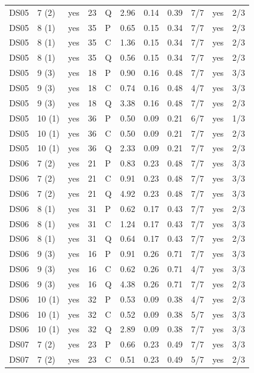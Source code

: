 \documentclass[10pt]{article}
\begin{document}
{\begin{longtable}{lllrlrrrrlr}
DS05 & 7 (2) & yes & 23 & Q & 2.96 & 0.14 & 0.39 & 7/7 & yes & 2/3 \\
DS05 & 8 (1) & yes & 35 & P & 0.65 & 0.15 & 0.34 & 7/7 & yes & 2/3 \\
DS05 & 8 (1) & yes & 35 & C & 1.36 & 0.15 & 0.34 & 7/7 & yes & 2/3 \\
DS05 & 8 (1) & yes & 35 & Q & 0.56 & 0.15 & 0.34 & 7/7 & yes & 2/3 \\
DS05 & 9 (3) & yes & 18 & P & 0.90 & 0.16 & 0.48 & 7/7 & yes & 3/3 \\
DS05 & 9 (3) & yes & 18 & C & 0.74 & 0.16 & 0.48 & 4/7 & yes & 3/3 \\
DS05 & 9 (3) & yes & 18 & Q & 3.38 & 0.16 & 0.48 & 7/7 & yes & 2/3 \\
DS05 & 10 (1) & yes & 36 & P & 0.50 & 0.09 & 0.21 & 6/7 & yes & 1/3 \\
DS05 & 10 (1) & yes & 36 & C & 0.50 & 0.09 & 0.21 & 7/7 & yes & 2/3 \\
DS05 & 10 (1) & yes & 36 & Q & 2.33 & 0.09 & 0.21 & 7/7 & yes & 2/3 \\
\midrule
DS06 & 7 (2) & yes & 21 & P & 0.83 & 0.23 & 0.48 & 7/7 & yes & 3/3 \\
DS06 & 7 (2) & yes & 21 & C & 0.91 & 0.23 & 0.48 & 7/7 & yes & 3/3 \\
DS06 & 7 (2) & yes & 21 & Q & 4.92 & 0.23 & 0.48 & 7/7 & yes & 3/3 \\
DS06 & 8 (1) & yes & 31 & P & 0.62 & 0.17 & 0.43 & 7/7 & yes & 2/3 \\
DS06 & 8 (1) & yes & 31 & C & 1.24 & 0.17 & 0.43 & 7/7 & yes & 3/3 \\
DS06 & 8 (1) & yes & 31 & Q & 0.64 & 0.17 & 0.43 & 7/7 & yes & 2/3 \\
DS06 & 9 (3) & yes & 16 & P & 0.91 & 0.26 & 0.71 & 7/7 & yes & 3/3 \\
DS06 & 9 (3) & yes & 16 & C & 0.62 & 0.26 & 0.71 & 4/7 & yes & 3/3 \\
DS06 & 9 (3) & yes & 16 & Q & 4.38 & 0.26 & 0.71 & 7/7 & yes & 2/3 \\
DS06 & 10 (1) & yes & 32 & P & 0.53 & 0.09 & 0.38 & 4/7 & yes & 2/3 \\
DS06 & 10 (1) & yes & 32 & C & 0.52 & 0.09 & 0.38 & 5/7 & yes & 3/3 \\
DS06 & 10 (1) & yes & 32 & Q & 2.89 & 0.09 & 0.38 & 7/7 & yes & 3/3 \\
\midrule
DS07 & 7 (2) & yes & 23 & P & 0.66 & 0.23 & 0.49 & 7/7 & yes & 3/3 \\
DS07 & 7 (2) & yes & 23 & C & 0.51 & 0.23 & 0.49 & 5/7 & yes & 2/3 \\

\end{longtable}}
\end{document}
